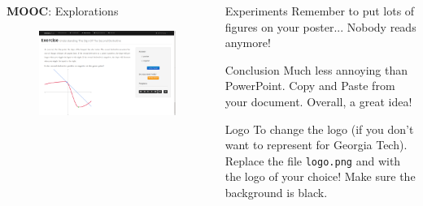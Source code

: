 \documentclass[serif,mathserif,final]{beamer}
\newcommand{\mooculus}{\textsf{\textbf{MOOC}\upshape{ULUS}}}
\begin{document}
{\begin{frame}{}
\begin{columns}[t]
\begin{column}{0.32\linewidth}
      \begin{block}{\mooculus: Explorations}
        \begin{figure}[htb]
          \centering
          \includegraphics[width=.9\columnwidth]{exercise}
        \end{figure}
      \end{block}

    \end{column}%

    \begin{column}{0.32\linewidth}

      \begin{block}{Experiments}
        Remember to put lots of figures on your poster... Nobody reads anymore!
      \end{block}

      \begin{block}{Conclusion}
        Much less annoying than PowerPoint.  Copy and Paste from your
        document. Overall, a great idea!
      \end{block}

      \begin{block}{Logo}
        To change the logo (if you don't want to represent for Georgia Tech).
        Replace the file {\tt logo.png} and with the logo of your choice!
        Make sure the background is black.
      \end{block}

    \end{column}%

  \end{columns}
\end{frame}
}
\end{document}

